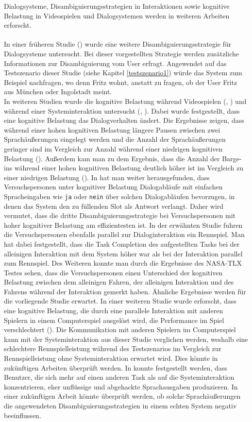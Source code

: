 \documentclass[12pt,a4paper]{scrartcl}
\begin{document}
Dialogsysteme, Disambiguierungsstrategien in Interaktionen sowie kognitive Belastung in Videospielen und Dialogsystemen werden in weiteren Arbeiten erforscht. \\
\\
In einer früheren Studie (\cite{idsia}) wurde eine weitere Disambiguierungsstrategie für Dialogsysteme untersucht. Bei dieser vorgestellten Strategie werden zusätzliche Informationen zur Disambiguierung vom User erfragt. Angewendet auf das Testszenario dieser Studie (siehe Kapitel \ref{testszenario1}) würde das System zum Beispiel nachfragen, wo denn Fritz wohnt, anstatt zu fragen, ob der User Fritz aus München oder Ingolstadt meint.\\
In weiteren Studien wurde die kognitive Belastung während Videospielen (\cite{CLmmorpg}, \cite{eCLDS}) und während einer Systeminteraktion untersucht (\cite{DbCL}, \cite{eCLDS}). Dabei wurde festgestellt, dass eine kognitive Belastung das Dialogverhalten ändert. Die Ergebnisse zeigen, dass während einer hohen kognitiven Belastung längere Pausen zwischen zwei Sprachäußerungen eingelegt werden und die Anzahl der Sprachäußerungen  geringer sind im Vergleich zur Anzahl während einer niedrigen kognitiven Belastung (\cite{DbCL}). Außerdem kam man zu dem Ergebnis, dass die Anzahl der Barge-ins während einer hohen kognitiven Belastung deutlich höher ist im Vergleich zu einer niedrigen Belastung (\cite{eCLDS}).
In \cite{eCLDS} hat man weiter herausgefunden, dass Versuchspersonen unter kognitiver Belastung Dialogabläufe mit einfachen Spracheingaben wie \texttt{ja} oder \texttt{nein} über solchen Dialogabläufen bevorzugen, in denen das System den zu füllenden Slot als Antwort verlangt. Daher wird vermutet, dass die dritte Disambiguierungsstrategie bei Versuchspersonen mit hoher kognitiver Belastung am effizientesten ist.  In der erwähnten Studie fuhren die Versuchspersonen ebenfalls parallel zur Dialoginteraktion ein Rennspiel. Man hat dabei festgestellt, dass die Task Completion des aufgestellten Tasks bei der alleinigen Interaktion mit dem System höher war als bei der Interaktion parallel zum Rennspiel. Des Weiteren konnte man durch die Ergebnisse des NASA-TLX Testes sehen, dass die Versuchspersonen einen Unterschied der kognitiven Belastung zwischen dem alleinigen Fahren, der alleinigen Interaktion und des Fahrens während der Interaktion gemerkt haben. Ähnliche Ergebnisse werden für die vorliegende Studie erwartet.
In einer weiteren Studie wurde erforscht, dass eine kognitive Belastung, die durch eine parallele Interaktion mit anderen Spielern in einem Computerspiel ausgelöst wird, die Performance im Spiel verschlechtert (\cite{CLmmorpg}).  Die Kommunikation mit anderen Spielern im Computerspiel kann mit der Systeminteraktion aus dieser Studie verglichen werden, weshalb eine schlechtere Rennspielleistung während des Testszenarios im Vergleich zur Rennspielleistung ohne Systeminteraktion erwartet wird. Dies könnte in zukünftigen Arbeiten überprüft werden. In \cite{Wozhcd} konnte festgestellt werden, dass Benutzer, die sich mehr auf einen anderen Task als auf die Systeminteraktion konzentrieren, eher unflüssige und abgehackte Sprachausgaben produzieren. In einer zukünftigen Arbeit könnte überprüft werden, ob solche Sprachäußerungen die angewendeten Disambiguierungsstrategien in einem echten System negativ beeinflussen.
\end{document}
